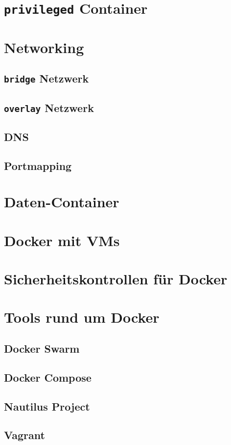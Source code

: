 \documentclass[11pt,a4paper,oneside]{report}
\begin{document}
	\section{\texttt{privileged} Container}
	\section{Networking}
		\subsection{\texttt{bridge} Netzwerk}
		\subsection{\texttt{overlay} Netzwerk}
		\subsection{DNS}
		\subsection{Portmapping}
	\section{Daten-Container}
	\section{Docker mit VMs}
  \section{Sicherheitskontrollen für Docker}
	\section{Tools rund um Docker}
		\subsection{Docker Swarm}
		\subsection{Docker Compose}
		\subsection{Nautilus Project}
		\subsection{Vagrant}
\end{document}
